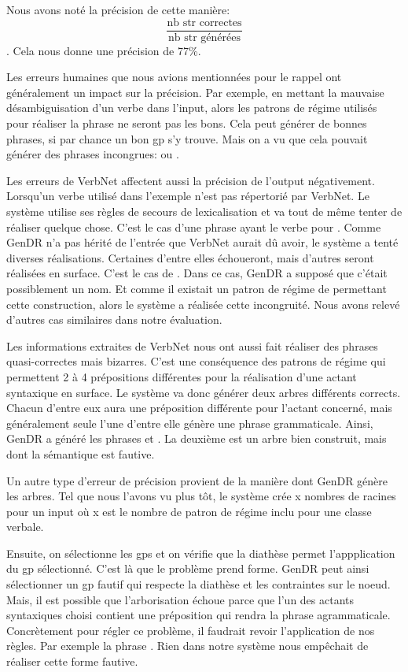 Nous avons noté la précision de cette manière:\[\frac{\text{nb str correctes}}{\text{nb str générées}}\]. Cela nous donne une précision de 77\%.

Les erreurs humaines que nous avions mentionnées pour le rappel ont généralement un impact sur la précision. Par exemple, en mettant la mauvaise désambiguisation d'un verbe dans l'input, alors les patrons de régime utilisés pour réaliser la phrase ne seront pas les bons. Cela peut générer de bonnes phrases, si par chance un bon gp s'y trouve. Mais on a vu que cela pouvait générer des phrases incongrues:  ou .

Les erreurs de VerbNet affectent aussi la précision de l'output négativement. Lorsqu'un verbe utilisé dans l'exemple n'est pas répertorié par VerbNet. Le système utilise ses règles de secours de lexicalisation et va tout de même tenter de réaliser quelque chose. C'est le cas d'une phrase ayant le verbe  pour . Comme GenDR n'a pas hérité de l'entrée que VerbNet aurait dû avoir, le système a tenté diverses réalisations. Certaines d'entre elles échoueront, mais d'autres seront réalisées en surface. C'est le cas de . Dans ce cas, GenDR a supposé que c'était possiblement un nom. Et comme il existait un patron de régime de  permettant cette construction, alors le système a réalisée cette incongruité. Nous avons relevé d'autres cas similaires dans notre évaluation.

Les informations extraites de VerbNet nous ont aussi fait réaliser des phrases quasi-correctes mais bizarres. C'est une conséquence des patrons de régime qui permettent 2 à 4 prépositions différentes pour la réalisation d'une actant syntaxique en surface. Le système va donc générer deux arbres différents corrects. Chacun d'entre eux aura une préposition différente pour l'actant concerné, mais généralement seule l'une d'entre elle génère une phrase grammaticale. Ainsi, GenDR a généré les phrases  et . La deuxième est un arbre bien construit, mais dont la sémantique est fautive.

Un autre type d'erreur de précision provient de la manière dont GenDR génère les arbres. Tel que nous l'avons vu plus tôt, le système crée x nombres de racines pour un input où x est le nombre de patron de régime inclu pour une classe verbale. 

Ensuite, on sélectionne les gps et on vérifie que la diathèse permet l'appplication du gp sélectionné. C'est là que le problème prend forme. GenDR peut ainsi sélectionner un gp fautif qui respecte la diathèse et les contraintes sur le noe{}ud. Mais, il est possible que l'arborisation échoue parce que l'un des actants syntaxiques choisi contient une préposition qui rendra la phrase agrammaticale. Concrètement pour régler ce problème, il faudrait revoir l'application de nos règles. Par exemple la phrase . Rien dans notre système nous empêchait de réaliser cette forme fautive.

